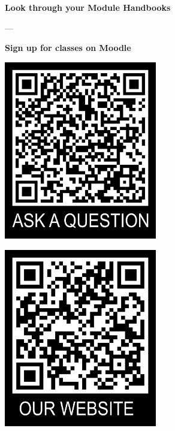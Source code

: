 \documentclass[aspectratio=169,hyperref={unicode},xcolor={dvipsnames}]{beamer}
\begin{document}
\begin{frame}
\begin{center}
\textbf{Look through your Module Handbooks}

---

\textbf{Sign up for classes on Moodle}
\vspace{1em}

\begin{minipage}{0.4\textwidth}
\centering
    \includegraphics[width=0.5\textwidth]{../QRtemplate_5.png}
  \end{minipage}
  \hfill
  \begin{minipage}{0.4\textwidth}
  \centering
    \includegraphics[width=0.5\textwidth]{../QRtemplate_4.png}
  \end{minipage}
\end{center}
\end{frame}
\end{document}
